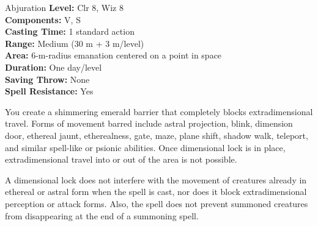 {Abjuration}
{
	\textbf{Level:}
	Clr 8, Wiz 8\\
	\textbf{Components:}
	V, S\\
	\textbf{Casting Time:}
	1 standard action\\
	\textbf{Range:}
	Medium (30 m + 3 m/level)\\
	\textbf{Area:}
	6-m-radius emanation centered on a point in space\\
	\textbf{Duration:}
	One day/level\\
	\textbf{Saving Throw:}
	None\\
	\textbf{Spell Resistance:}
	Yes\\
}
{
	You create a shimmering emerald barrier that completely blocks extradimensional travel. Forms of movement barred include astral projection, blink, dimension door, ethereal jaunt, etherealness, gate, maze, plane shift, shadow walk, teleport, and similar spell-like or psionic abilities. Once dimensional lock is in place, extradimensional travel into or out of the area is not possible.

	A dimensional lock does not interfere with the movement of creatures already in ethereal or astral form when the spell is cast, nor does it block extradimensional perception or attack forms. Also, the spell does not prevent summoned creatures from disappearing at the end of a summoning spell.

}
